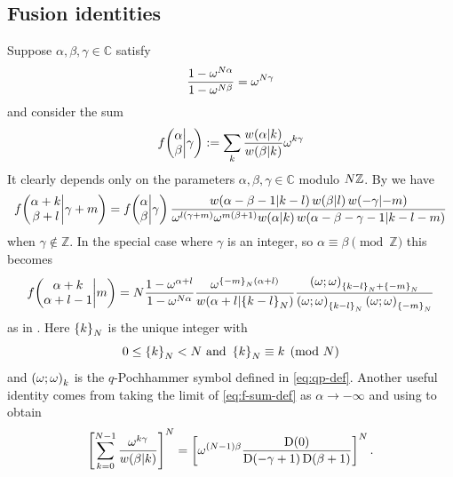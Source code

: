 \documentclass{sl2ams}
\numberwithin{equation}{section}
\newcommand{\CC}{\mathbb{C}}
\newcommand{\ZZ}{\mathbb{Z}}
\begin{document}
\subsection{Fusion identities}
\label{sec:fusion-identities}
Suppose \(\alpha, \beta, \gamma \in \CC\) satisfy
\begin{equation}
  \frac{
    1 - \omega^{N \alpha}
    }{
    1- \omega^{N \beta}
  }
  =
  \omega^{N \gamma}
\end{equation}
and consider the sum
\begin{equation}
  \label{eq:f-sum-def}
  f\mathopen{}\left( \begin{matrix} \alpha \\ \beta \end{matrix}\middle| \gamma \right) 
  \mathrel{:=}
  \sum_{k}
  \frac{
    w\mathopen{}\left(\alpha \middle | k \right)
  }{
    w\mathopen{}\left(\beta \middle | k \right)
  }
  \omega^{k\gamma}
\end{equation}
It clearly depends only on the parameters \(\alpha, \beta, \gamma \in \CC\) modulo \(\nr \ZZ\).
By \cite[eq.\@ A.14]{Kashaev1993} we have
\begin{equation}
  \label{eq:fusion-identity-i}
  f\mathopen{}\left( \begin{matrix} \alpha + k \\ \beta + l \end{matrix}\middle| \gamma + m \right) 
  =
  f\mathopen{}\left( \begin{matrix} \alpha \\ \beta \end{matrix}\middle| \gamma \right) 
  \frac{
    w\mathopen{}\left(\alpha - \beta -1 \middle | k-l \right)
    w\mathopen{}\left(\beta \middle | l \right)
    w\mathopen{}\left(-\gamma \middle | -m \right)
  }{
    \omega^{l (\gamma + m)}
    \omega^{m(\beta + 1)}
    w\mathopen{}\left(\alpha \middle | k \right)
    w\mathopen{}\left(\alpha - \beta - \gamma - 1 \middle | k - l - m \right)
  }
\end{equation}
when \(\gamma \not \in \ZZ\).
In the special case where \(\gamma\) is an integer, so \(\alpha \equiv \beta \pmod {\ZZ}\) this becomes
\begin{equation}
  \label{eq:fusion-identity-ii}
  \fstack{\alpha + k}{\alpha + l-1}{m} 
  =
  \nr
  \frac{
    1 - \omega^{\alpha + l}
  }{
    1 - \omega^{\nr \alpha}
  }
  \frac{
    \omega^{\modb{-m}(\alpha + l)}
  }{
    \qlog{\alpha + l}{\modb{k - l}}
  }
  \frac{
    \qp{\omega}{\modb{k - l} + \modb{-m}}
  }{
    \qp{\omega}{\modb{k - l}}
    \qp{\omega}{\modb{-m}}
  }
\end{equation}
as in \cite[eq.\@ 40]{Garoufalidis2021descendant}.
Here \(\left\{k\right\}_{N}\) is the unique integer with
\[
  0 \le \left\{k\right\}_{N} < N
  \text{ and }
  \left\{k\right\}_{N} \equiv k \pmod {N}
\]
and \(\qp{\omega}[\omega]{k}\) is the \(q\)-Pochhammer symbol defined in \cref{eq:qp-def}.
Another useful identity comes from taking the limit of \eqref{eq:f-sum-def} as \(\alpha \to -\infty\) and using \cite[eq.\@ C.7]{Kashaev1993} to obtain
\begin{equation}
  \label{eq:f-Nth-power}
  \left[
    \sum_{k=0}^{\nr-1}
    \frac{\omega^{k \gamma}}{\qlog{\beta}{k}}
  \right]^{\nr}
  =
  \left[
    \omega^{(\nr-1)\beta}
    \frac{
      \df{0}
    }{
      \df{-\gamma + 1}
      \df{\beta + 1}
  }
  \right]^{\nr}
  .
\end{equation}
\end{document}
